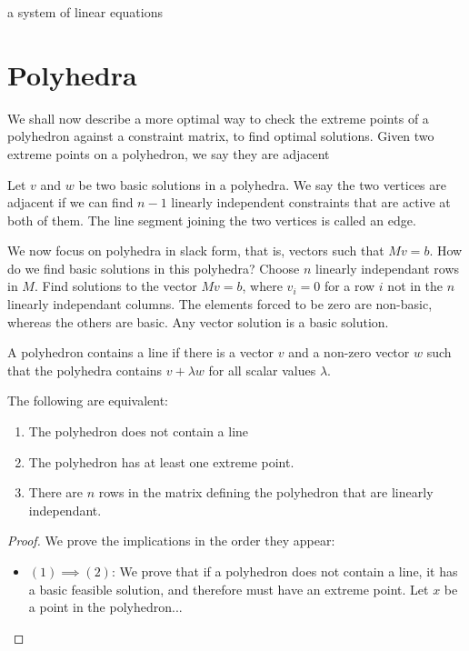     a system of linear equations 






    \chapter{Polyhedra}

    We shall now describe a more optimal way to check the extreme points of a polyhedron against a constraint matrix, to find optimal solutions. Given two extreme points on a polyhedron, we say they are adjacent

    \begin{definition}
        Let $v$ and $w$ be two basic solutions in a polyhedra. We say the two vertices are adjacent if we can find $n-1$ linearly independent constraints that are active at both of them. The line segment joining the two vertices is called an edge.
    \end{definition}

    We now focus on polyhedra in slack form, that is, vectors such that $Mv = b$. How do we find basic solutions in this polyhedra? Choose $n$ linearly independant rows in $M$. Find solutions to the vector $Mv = b$, where $v_i = 0$ for a row $i$ not in the $n$ linearly independant columns. The elements forced to be zero are non-basic, whereas the others are basic. Any vector solution is a basic solution.

    \begin{definition}
        A polyhedron contains a line if there is a vector $v$ and a non-zero vector $w$ such that the polyhedra contains $v + \lambda w$ for all scalar values $\lambda$.
    \end{definition}

    \begin{theorem}
        The following are equivalent:

        \begin{enumerate}
            \item The polyhedron does not contain a line
            \item The polyhedron has at least one extreme point.
            \item There are $n$ rows in the matrix defining the polyhedron that are linearly independant.
        \end{enumerate}
    \end{theorem}

    \begin{proof}
        We prove the implications in the order they appear:

        \begin{itemize}
            \item $(1) \implies (2)$: We prove that if a polyhedron does not contain a line, it has a basic feasible solution, and therefore must have an extreme point. Let $x$ be a point in the polyhedron...
        \end{itemize}
    \end{proof}










